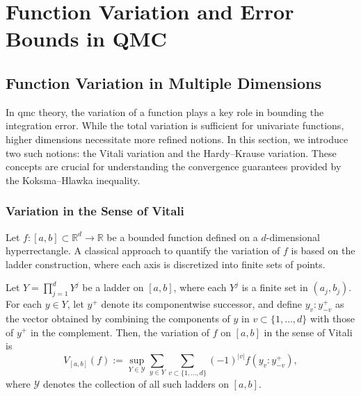 \chapter{Function Variation and Error Bounds in QMC}
\label{chapter3}

\section{Function Variation in Multiple Dimensions}

In \ac{qmc} theory, the variation of a function plays a key role in bounding the integration error. While the total variation is sufficient for univariate functions, higher dimensions necessitate more refined notions. In this section, we introduce two such notions: the Vitali variation and the Hardy–Krause variation. These concepts are crucial for understanding the convergence guarantees provided by the Koksma–Hlawka inequality.

\subsection{Variation in the Sense of Vitali}
\label{sec:vitali-variation}

Let $f \colon [a,b] \subset \mathbb{R}^d \to \mathbb{R}$ be a bounded function defined on a $d$-dimensional hyperrectangle. A classical approach to quantify the variation of $f$ is based on the ladder construction, where each axis is discretized into finite sets of points.

\begin{definition}
Let $Y = \prod_{j=1}^d Y^j$ be a ladder on $[a,b]$, where each $Y^j$ is a finite set in $(a_j, b_j)$. For each $y \in Y$, let $y^+$ denote its componentwise successor, and define $y_v : y_{-v}^+$ as the vector obtained by combining the components of $y$ in $v \subset \{1,\dots,d\}$ with those of $y^+$ in the complement. Then, the variation of $f$ on $[a,b]$ in the sense of Vitali is
\begin{equation*}
    V_{[a,b]}(f) := \sup_{Y \in \mathcal{Y}} \sum_{y \in Y} \sum_{v \subset \{1,\dots,d\}} (-1)^{|v|} f(y_v : y_{-v}^+),
\end{equation*}
where $\mathcal{Y}$ denotes the collection of all such ladders on $[a,b]$.
\end{definition}

